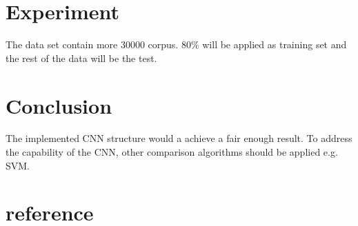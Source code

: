 \documentclass[a4paper]{article}
\begin{document}
\section{Experiment}\label{exp}

The data set contain more 30000 corpus. 80\% will be applied as training set and the rest of the data will be the test.

%
%
%
%

\section{Conclusion}\label{conclusion}

The implemented CNN structure would a achieve a fair enough result.
To address the capability of the CNN, other comparison algorithms should be applied e.g. SVM. 

\section{reference}


\end{document}
